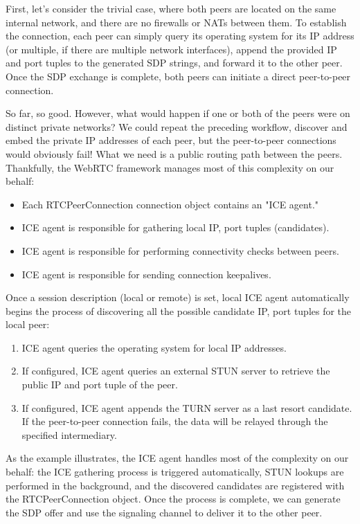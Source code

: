First, let's consider the trivial case, where both peers are located on the same internal network,
and there are no firewalls or NATs between them. To establish the connection, each peer can simply
query its operating system for its IP address (or multiple, if there are multiple network
interfaces), append the provided IP and port tuples to the generated SDP strings, and forward it to
the other peer. Once the SDP exchange is complete, both peers can initiate a direct peer-to-peer
connection.

So far, so good. However, what would happen if one or both of the peers were on distinct private
networks? We could repeat the preceding workflow, discover and embed the private IP addresses of
each peer, but the peer-to-peer connections would obviously fail! What we need is a public routing
path between the peers. Thankfully, the WebRTC framework manages most of this complexity on our
behalf:

\begin{itemize}
    \item Each RTCPeerConnection connection object contains an "ICE agent."
    \item ICE agent is responsible for gathering local IP, port tuples (candidates).
    \item ICE agent is responsible for performing connectivity checks between peers.
    \item ICE agent is responsible for sending connection keepalives.
\end{itemize}

Once a session description (local or remote) is set, local ICE agent automatically begins the
process of discovering all the possible candidate IP, port tuples for the local peer:

\begin{enumerate}
    \item ICE agent queries the operating system for local IP addresses.
    \item If configured, ICE agent queries an external STUN server to retrieve the public IP and
          port tuple of the peer.
    \item If configured, ICE agent appends the TURN server as a last resort candidate. If the
          peer-to-peer connection fails, the data will be relayed through the specified
          intermediary.
\end{enumerate}

As the example illustrates, the ICE agent handles most of the complexity on our behalf: the ICE
gathering process is triggered automatically, STUN lookups are performed in the background, and the
discovered candidates are registered with the RTCPeerConnection object. Once the process is
complete, we can generate the SDP offer and use the signaling channel to deliver it to the other
peer.


